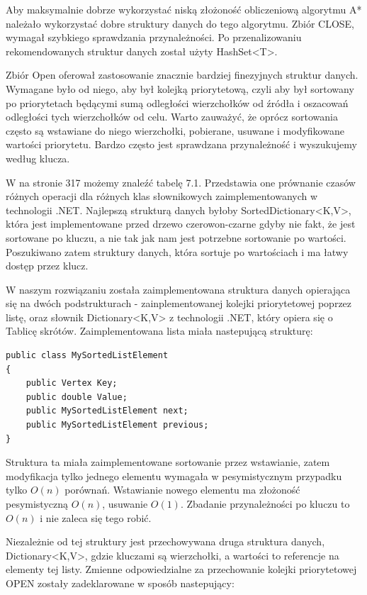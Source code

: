 \documentclass[a4paper,11pt,twoside]{report}
\theoremstyle{definition}
\begin{document}
Aby maksymalnie dobrze wykorzystać niską złożoność obliczeniową algorytmu A* należało wykorzystać dobre struktury danych do tego algorytmu. Zbiór CLOSE,  wymagał szybkiego sprawdzania przynależności. Po przenalizowaniu rekomendowanych struktur danych \cite{Dotnet struktury} został użyty HashSet<T>. 

Zbiór Open oferował zastosowanie znacznie bardziej finezyjnych struktur danych. Wymagane było od niego, aby był kolejką priorytetową, czyli aby był sortowany po priorytetach będącymi sumą odległości wierzchołków od źródła i oszacowań odległości tych wierzchołków od celu. Warto zauważyć, że oprócz sortowania często są wstawiane do niego wierzchołki, pobierane, usuwane i modyfikowane wartości priorytetu. Bardzo często jest sprawdzana przynależność i wyszukujemy według klucza. 

W \cite{C w pigulce} na stronie 317 możemy znaleźć tabelę 7.1. Przedstawia one prównanie czasów różnych operacji dla różnych klas słownikowych zaimplementowanych w technologii .NET. Najlepszą strukturą danych byłoby SortedDictionary<K,V>, która jest implementowane przed drzewo czerowon-czarne gdyby nie fakt, że jest sortowane po kluczu, a nie tak jak nam jest potrzebne sortowanie po wartości. Poszukiwano zatem struktury danych, która sortuje po wartościach i ma łatwy dostęp przez klucz. 

W naszym rozwiązaniu została zaimplementowana struktura danych opierająca się na dwóch podstrukturach - zainplementowanej kolejki priorytetowej poprzez listę, oraz słownik Dictionary<K,V> z technologii .NET, który opiera się o Tablicę skrótów. Zaimplementowana lista miała nastepującą strukturę:

\begin{verbatim}
public class MySortedListElement
{
    public Vertex Key;
    public double Value;
    public MySortedListElement next;
    public MySortedListElement previous;
}
\end{verbatim}

Struktura ta miała zaimplementowane sortowanie przez wstawianie, zatem modyfikacja tylko jednego elementu wymagała w pesymistycznym przypadku tylko $O(n)$ porównań. Wstawianie nowego elementu ma złożoność pesymistyczną $O(n)$, usuwanie $O(1)$. Zbadanie przynależności po kluczu to $O(n)$ i nie zaleca się tego robić. 

Niezależnie od tej struktury jest przechowywana druga struktura danych, Dictionary<K,V>, gdzie kluczami są wierzchołki, a wartości to referencje na elementy tej listy. Zmienne odpowiedzialne za przechowanie kolejki priorytetowej OPEN zostały zadeklarowane w sposób nastepujący:
\end{document}
